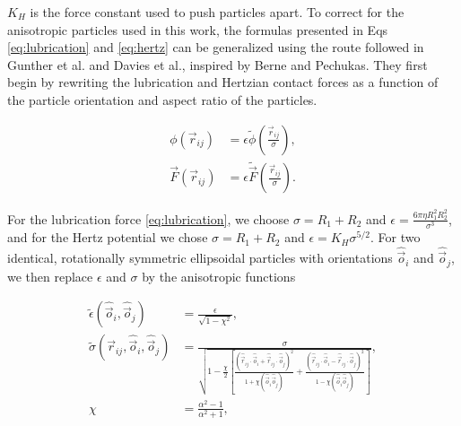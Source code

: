 $K_H$ is the force constant used to push particles apart. To correct for the anisotropic particles used in this work, 
the formulas presented in Eqs \ref{eq:lubrication} and \ref{eq:hertz} can be generalized using the route followed 
in Gunther et al. and Davies et al., inspired by Berne and Pechukas. \cite{gunther_timescales_2014, davies_interface_2014} 
They first begin by rewriting the lubrication and Hertzian contact forces as a function of the particle orientation and 
aspect ratio of the particles.

\begin{equation}
    \begin{split}
    \phi(\vec{r}_{ij}) &= {\epsilon} \tilde{\phi}\left(\frac{\vec{r}_{ij}}{{\sigma}}\right) , \\
    \vec{F}(\vec{r}_{ij}) &= {\epsilon} \tilde{\vec{F}}\left(\frac{\vec{r}_{ij}}{{\sigma}}\right) .
    \end{split}
\end{equation}

For the lubrication force \eqref{eq:lubrication}, we choose
${\sigma}=R_1+R_2$ and ${\epsilon}=\frac{6\pi\eta R_1^2 R_2^2}{{\sigma^3}}$, and for the
Hertz potential we chose ${\sigma}=R_1+R_2$ and ${\epsilon}=K_H\sigma^{5/2}$. For two identical, rotationally
symmetric ellipsoidal particles with orientations $\hat{\vec{o}}_i$ and $\hat{\vec{o}}_j$, we then replace $\epsilon$ and $\sigma$ by
the anisotropic functions

\begin{equation}
    \begin{split}
    \tilde\epsilon\left(\hat{\vec{o}}_i, \hat{\vec{o}}_j\right) &= \frac{{\epsilon}}{\sqrt{1-\chi^2}} , \\
    \tilde\sigma\left(\vec{r}_{ij}, \hat{\vec{o}}_i, \hat{\vec{o}}_j\right) &= \frac{{\sigma}}{\sqrt{1-\frac{\chi}{2}\left[ \frac{\left(\hat{\vec{r}}_{ij}\cdot\hat{\vec{o}}_i+\hat{\vec{r}}_{ij}\cdot\hat{\vec{o}}_j\right)^2}{1+\chi\left(\hat{\vec{o}}_i\hat{\vec{o}}_j\right)} + \frac{\left(\hat{\vec{r}}_{ij}\cdot\hat{\vec{o}}_i-\hat{\vec{r}}_{ij}\cdot\hat{\vec{o}}_j\right)^2}{1-\chi\left(\hat{\vec{o}}_i\hat{\vec{o}}_j\right)} \right] }} , \\
    \chi &= \frac{\alpha^2-1}{\alpha^2+1} , \\
    \end{split}
\end{equation}

